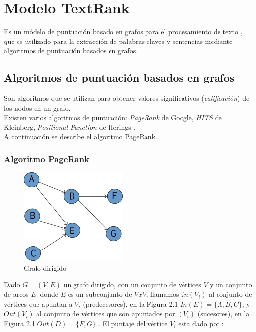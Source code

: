 \section{Modelo TextRank}
Es un m\'odelo de puntuaci\'on basado en grafos para el procesamiento de
texto \cite{RMPT04}, que es utilizado para la extracci\'on de palabras claves
y sentencias mediante algoritmos de puntuaci\'on basados en grafos.

\subsection{Algoritmos de puntuaci\'on basados en grafos}
Son algoritmos que se utilizan para obtener valores significativos
(\emph{calificaci\'on}) de los nodos en un grafo. \\

Existen varios algoritmos de puntuaci\'on: \emph{PageRank} de Google,
\emph{HITS} de Kleinberg, \emph{Positional Function} de Herings \cite{RM04}. \\

A continuaci\'on se describe el algoritmo PageRank.

\subsubsection{Algoritmo PageRank}
\begin{figure}
	\centering
		\includegraphics[]{recursos/img/grafoDirigido}
		\caption {Grafo dirigido}
\end{figure}

Dado $G=(V,E)$ un grafo dirigido, con un conjunto de v\'ertices $V$ y un conjunto
de arcos $E$, donde $E$ es un subconjunto de $V x V$, llamamos $In(V_i)$ al
conjunto de v\'ertices que apuntan a $V_i$ (predecesores),  en la Figura 2.1
$In(E)=\{A,B,C\}$, y $Out(V_i)$ al conjunto de v\'ertices que son apuntados por $(V_i)$
(sucesores), en la Figura 2.1 $Out(D)=\{F,G\}$ . El puntaje del v\'ertice $V_i$ 
esta dado por \cite{SBLP98}:

